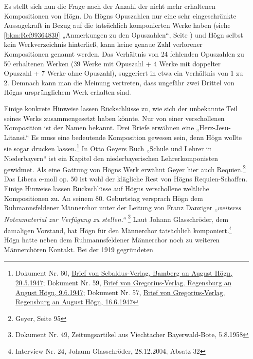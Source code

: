 \documentclass[a4paper]{article}
\newcommand\textstyleZitate[1]{\textit{#1}}
\newcommand\textstyleFunotenTextZchn[1]{#1}
\begin{document}
Es stellt sich nun die Frage nach der Anzahl der nicht mehr erhaltenen
Kompositionen von Högn. Da Högns Opuszahlen nur eine sehr
eingeschränkte Aussagekraft in Bezug auf die tatsächlich komponierten
Werke haben (siehe \ref{bkm:Ref99364830} „Anmerkungen zu den
Opuszahlen“, Seite \pageref{bkm:Ref98509933}) und Högn selbst kein
Werkverzeichnis hinterließ, kann keine genaue Zahl verlorener
Kompositionen genannt werden. Das Verhältnis von 24 fehlenden
Opuszahlen zu 50 erhaltenen Werken (39 Werke mit Opuszahl + 4 Werke mit
doppelter Opuszahl + 7 Werke ohne Opuszahl), suggeriert in etwa ein
Verhältnis von 1 zu 2. Demnach kann man die Meinung vertreten, dass
ungefähr zwei Drittel von Högns ursprünglichem Werk erhalten sind.

Einige konkrete Hinweise lassen Rückschlüsse zu, wie sich der unbekannte
Teil seines Werks zusammengesetzt haben könnte. Nur von einer
verschollenen Komposition ist der Namen bekannt. Drei Briefe erwähnen
eine „Herz-Jesu-Litanei.“ Es muss eine bedeutende Komposition gewesen
sein, denn Högn wollte sie sogar drucken lassen.\footnote{
\textstyleFunotenTextZchn{Dokument Nr. 60,
}\href{http://localhost/hoegn/dokumente/dokumente_einzeln.php?id=60}{\textstyleFunotenTextZchn{Brief
von Sebaldus-Verlag, Bamberg an August Högn,
20.5.1947}}\textstyleFunotenTextZchn{; Dokument Nr. 59,
}\href{http://localhost/hoegn/dokumente/dokumente_einzeln.php?id=59}{\textstyleFunotenTextZchn{Brief
von Gregorius-Verlag, Regensburg an August Högn,
9.6.1947}}\textstyleFunotenTextZchn{; Dokument Nr. 57,
}\href{http://localhost/hoegn/dokumente/dokumente_einzeln.php?id=57}{\textstyleFunotenTextZchn{Brief
von Gregorius-Verlag, Regensburg an August Högn, 16.6.1947}}} In Otto
Geyers Buch „Schule und Lehrer in Niederbayern“ ist ein Kapitel den
niederbayerischen Lehrerkomponisten gewidmet. Als eine Gattung von
Högns Werk erwähnt Geyer hier auch Requien.\footnote{ Geyer, Seite 95}
Das Libera e-moll op. 50 ist wohl der klägliche Rest von Högns
Requien-Schaffen. Einige Hinweise lassen Rückschlüsse auf Högns
verschollene weltliche Kompositionen zu. An seinem 80. Geburtstag
versprach Högn dem Ruhmannsfeldener Männerchor unter der Leitung von
Franz Danziger \textstyleZitate{„weiteres Notenmaterial zur Verfügung
zu stellen.“ }\footnote{ Dokument Nr. 49, Zeitungsartikel aus
Viechtacher Bayerwald-Bote, 5.8.1958} Laut Johann Glasschröder, dem
damaligen Vorstand, hat Högn für den Männerchor tatsächlich
komponiert.\footnote{ Interview Nr. 24, Johann Glasschröder,
28.12.2004, Absatz 32} Högn hatte neben dem Ruhmannsfeldener Männerchor
noch zu weiteren Männerchören Kontakt. Bei der 1919 gegründeten
\end{document}
